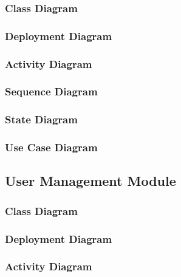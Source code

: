 \documentclass{article}
\begin{document}
			\subsubsection{Class Diagram}\label{subsec:uml-diagrams-poi-class}
			
			
			\subsubsection{Deployment Diagram}\label{subsec:uml-diagrams-poi-dep}
			
			
			\subsubsection{Activity Diagram}\label{subsec:uml-diagrams-poi-act}
			
			
			\subsubsection{Sequence Diagram}\label{subsec:uml-diagrams-poi-seq}
						
			
			\subsubsection{State Diagram}\label{subsec:uml-diagrams-poi-state}
			
			
			\subsubsection{Use Case Diagram}\label{subsec:uml-diagrams-poi-uc}
		
		\clearpage
	
		\subsection{User Management Module}\label{subsec:uml-diagrams-users}
			
		
			\subsubsection{Class Diagram}\label{subsec:uml-diagrams-users-class}
			
			
			\subsubsection{Deployment Diagram}\label{subsec:uml-diagrams-users-dep}
			
			
			\subsubsection{Activity Diagram}\label{subsec:uml-diagrams-users-act}
			
\end{document}
